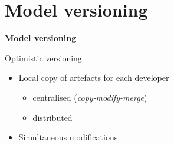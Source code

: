 \documentclass[dvips,slidetop,mathserif,brown]{beamer}
\begin{document}
\section{Model versioning}

\begin{frame}{}
  \begin{center}
    \begin{Huge}
      \textbf{Model versioning}
    \end{Huge}
  \end{center}
\end{frame}


\begin{frame}{Optimistic versioning}
  \begin{itemize}
    \item Local copy of artefacts for each developer
    \begin{itemize}
      \item centralised (\emph{copy-modify-merge})
      \item distributed
    \end{itemize}
    \item Simultaneous modifications
  \end{itemize}
\end{frame}
\end{document}
